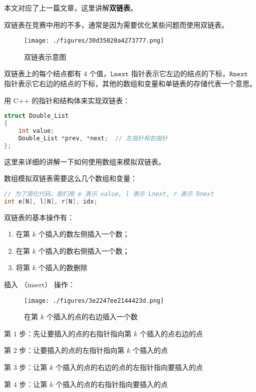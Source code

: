 
本文对应了上一篇文章，这里讲解\textbf{双链表}。

双链表在竞赛中用的不多，通常是因为需要优化某些问题而使用双链表。

\begin{figure}[ht]
\centering
\texttt{[image: ./figures/30d35020a4273777.png]}
\caption{双链表示意图} \label{fig_DList_1}
\end{figure}

双链表上的每个结点都有 $4$ 个值，$\mathtt{Lnext}$ 指针表示它左边的结点的下标，$\mathtt{Rnext}$ 指针表示它右边的结点的下标，其他的数组和变量和单链表的存储代表一个意思。

用 C++ 的指针和结构体来实现双链表：
\begin{lstlisting}[language=cpp]
struct Double_List
{
    int value;
    Double_List *prev, *next;  // 左指针和右指针
};
\end{lstlisting}

这里来详细的讲解一下如何使用数组来模拟双链表。

数组模拟双链表需要这么几个数组和变量：
\begin{lstlisting}[language=cpp]
// 为了简化代码，我们用 e 表示 value, l 表示 Lnext, r 表示 Rnext
int e[N], l[N], r[N], idx;
\end{lstlisting}

双链表的基本操作有：\begin{enumerate}
\item 在第 $k$ 个插入的数左侧插入一个数；
\item 在第 $k$ 个插入的数右侧插入一个数；
\item 将第 $k$ 个插入的数删除
\end{enumerate}

插入 （$\text{insert}$） 操作：

\begin{figure}[ht]
\centering
\texttt{[image: ./figures/3e2247ee2144423d.png]}
\caption{在第 $k$ 个插入的点的右边插入一个数} \label{fig_DList_2}
\end{figure}

第 $1$ 步：先让要插入的点的右指针指向第 $k$ 个插入的点右边的点

第 $2$ 步：让要插入的点的左指针指向第 $k$ 个插入的点

第 $3$ 步：让第 $k$ 个插入的点的右边的点的左指针指向要插入的点

第 $4$ 步：让第 $k$ 个插入的点的右指针指向要插入的点


